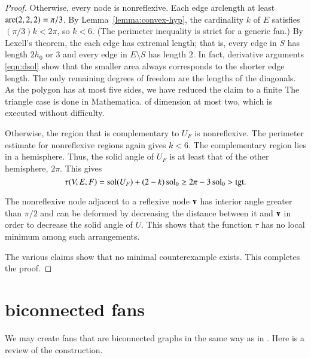 \documentclass{llncs}
\def\op#1{{\hbox{#1}}}
\begin{document}
\begin{proof}
  Otherwise,
every node is nonreflexive.  Each edge arclength at least
$\operatorname{arc}(2,2,2)=\pi/3$.  By Lemma~\ref{lemma:convex-hyp}, the cardinality
$k$ of $E$ satisfies $(\pi/3)k < 2\pi$, so $k<6$.  (The perimeter inequality is
strict for a generic fan.)  By Lexell's theorem, the each edge has
extremal length;  that is, every edge in $S$ has length $2h_0$ or
$3$ and every edge in $E\setminus S$ has length $2$.  In fact, derivative
arguments \eqref{eqn:dsol} show that the smaller area always
corresponds to the shorter edge length.  The only
remaining degrees of freedom are the lengths of the diagonals.  As the
polygon has at most five sides, we have reduced the claim  to a
finite  %
{The triangle case is done in Mathematica.} of dimension at
most two, which is executed without difficulty.

  Otherwise, the region that is complementary
to $U_F$ is nonreflexive.  The perimeter estimate for nonreflexive regions again
gives $k<6$.  The complementary region lies in a hemisphere.  Thus,
the solid angle of $U_F$ is at least that of the other hemisphere,
$2\pi$.
%
This gives
\[
\tau(V,E,F) = \sol(U_F) + (2-k)\sol_0 \ge 2\pi - 3\sol_0 > \op{tgt}.
\]


The nonreflexive node adjacent to a reflexive node ${\mathbf v}$ has interior angle greater
than $\pi/2$ and can be deformed by decreasing the distance between it
and ${\mathbf v}$ in order to decrease the solid angle of $U$.  This shows that the
function $\tau$ has no local minimum among such arrangements.


The various claims show that no minimal counterexample exists.  This
completes the proof.
\end{proof}

\section{biconnected fans}


We may create  fans that are biconnected graphs in the same way as in
\cite{Hales:2006:DCG}.  Here is a review
of the construction.
\end{document}
